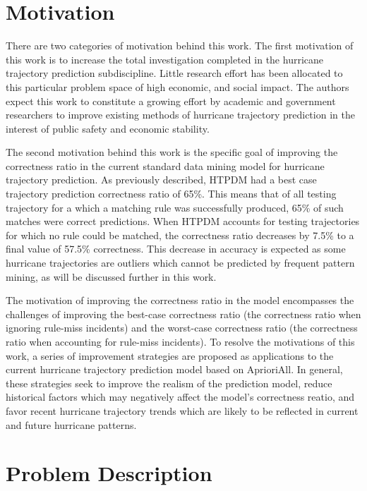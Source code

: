 \documentclass[12pt,conference]{IEEEtran}
\begin{document}

\section{Motivation}

There are two categories of motivation behind this work. The first motivation of this work is to increase the total investigation completed in the hurricane trajectory prediction subdiscipline. Little research effort has been allocated to this particular problem space of high economic, and social impact. The authors expect this work to constitute a growing effort by academic and government researchers to improve existing methods of hurricane trajectory prediction in the interest of public safety and economic stability.

The second motivation behind this work is the specific goal of improving the correctness ratio in the current standard data mining model for hurricane trajectory prediction. As previously described, HTPDM had a best case trajectory prediction correctness ratio of 65\%. This means that of all testing trajectory for a which a matching rule was successfully produced, 65\% of such matches were correct predictions. When HTPDM accounts for testing trajectories for which no rule could be matched, the correctness ratio decreases by 7.5\% to a final value of 57.5\% correctness. This decrease in accuracy is expected as some hurricane trajectories are outliers which cannot be predicted by frequent pattern mining, as will be discussed further in this work.

The motivation of improving the correctness ratio in the model encompasses the challenges of improving the best-case correctness ratio (the correctness ratio when ignoring rule-miss incidents) and the worst-case correctness ratio (the correctness ratio when accounting for rule-miss incidents). To resolve the motivations of this work, a series of improvement strategies are proposed as applications to the current hurricane trajectory prediction model based on AprioriAll. In general, these strategies seek to improve the realism of the prediction model, reduce historical factors which may negatively affect the model's correctness reatio, and favor recent hurricane trajectory trends which are likely to be reflected in current and future hurricane patterns.

\section{Problem Description}
\end{document}
